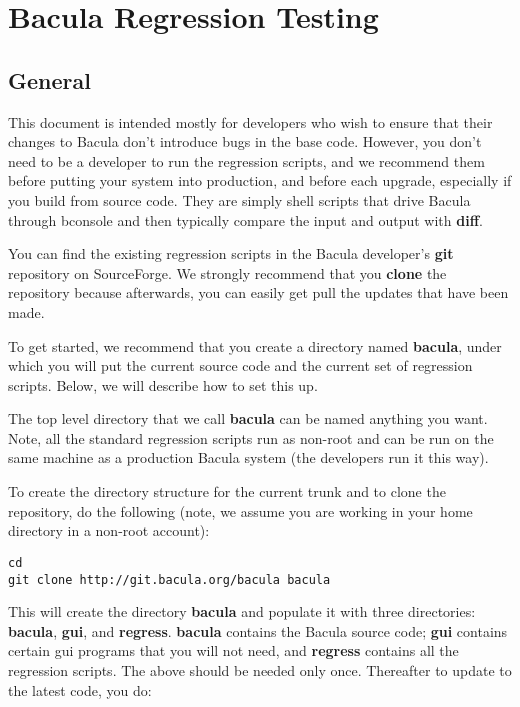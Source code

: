 
\chapter{Bacula Regression Testing}
\label{_ChapterStart8}

\section{General}

This document is intended mostly for developers who wish to ensure that their
changes to Bacula don't introduce bugs in the base code.  However, you
don't need to be a developer to run the regression scripts, and we 
recommend them before putting your system into production, and before each
upgrade, especially if you build from source code.  They are
simply shell scripts that drive Bacula through bconsole and then typically
compare the input and output with {\bf diff}.

You can find the existing regression scripts in the Bacula developer's
{\bf git} repository on SourceForge.  We strongly recommend that you {\bf
clone} the repository because afterwards, you can easily get pull the
updates that have been made.

To get started, we recommend that you create a directory named {\bf
bacula}, under which you will put the current source code and the current
set of regression scripts.  Below, we will describe how to set this up.

The top level directory that we call {\bf bacula} can be named anything you
want.  Note, all the standard regression scripts run as non-root and can be
run on the same machine as a production Bacula system (the developers run
it this way).

To create the directory structure for the current trunk and to
clone the repository, do the following (note, we assume you
are working in your home directory in a non-root account):

\footnotesize
\begin{verbatim}
cd
git clone http://git.bacula.org/bacula bacula
\end{verbatim}
\normalsize

This will create the directory {\bf bacula} and populate it with
three directories: {\bf bacula}, {\bf gui}, and {\bf regress}.
{\bf bacula} contains the Bacula source code; {\bf gui} contains
certain gui programs that you will not need, and {\bf regress} contains
all the regression scripts.  The above should be needed only
once. Thereafter to update to the latest code, you do:

